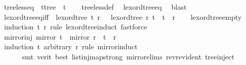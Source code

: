 \begin{isabellebody}
\ tree{\isacharunderscore}{\kern0pt}less{\isacharunderscore}{\kern0pt}eq{\isacharcolon}{\kern0pt}\ {\isachardoublequoteopen}{\isasymnot}\ {\isacharparenleft}{\kern0pt}t{\isacharcolon}{\kern0pt}{\isacharcolon}{\kern0pt}tree{\isacharparenright}{\kern0pt}\ {\isacharless}{\kern0pt}\ t{\isachardoublequoteclose}\isanewline
%
\isadelimproof
\ \ %
\endisadelimproof
%
\isatagproof
{}\isamarkupfalse%
\ tree{\isacharunderscore}{\kern0pt}less{\isacharunderscore}{\kern0pt}def\ \isamarkupfalse%
\ lexord{\isacharunderscore}{\kern0pt}tree{\isacharunderscore}{\kern0pt}eq\ \isamarkupfalse%
\ blast%
\endisatagproof
{\isafoldproof}%
%
\isadelimproof
\isanewline
%
\endisadelimproof
\isanewline
{}\isamarkupfalse%
\ lexord{\isacharunderscore}{\kern0pt}tree{\isacharunderscore}{\kern0pt}eq{\isacharunderscore}{\kern0pt}iff{\isacharcolon}{\kern0pt}\ {\isachardoublequoteopen}{\isasymnot}\ lexord{\isacharunderscore}{\kern0pt}tree\ t\ r\ {\isasymand}\ {\isasymnot}\ lexord{\isacharunderscore}{\kern0pt}tree\ r\ t\ {\isasymlongleftrightarrow}\ t\ {\isacharequal}{\kern0pt}\ r{\isachardoublequoteclose}\isanewline
%
\isadelimproof
\ \ %
\endisadelimproof
%
\isatagproof
{}\isamarkupfalse%
\ lexord{\isacharunderscore}{\kern0pt}tree{\isacharunderscore}{\kern0pt}empty{}\ \isamarkupfalse%
\ {\isacharparenleft}{\kern0pt}induction\ t\ r\ rule{\isacharcolon}{\kern0pt}\ lexord{\isacharunderscore}{\kern0pt}tree{\isachardot}{\kern0pt}induct{\isacharcomma}{\kern0pt}\ fastforce{\isacharplus}{\kern0pt}{\isacharparenright}{\kern0pt}%
\endisatagproof
{\isafoldproof}%
%
\isadelimproof
\isanewline
%
\endisadelimproof
\isanewline
{}\isamarkupfalse%
\ mirror{\isacharunderscore}{\kern0pt}inj{\isacharcolon}{\kern0pt}\ {\isachardoublequoteopen}mirror\ t\ {\isacharequal}{\kern0pt}\ mirror\ r\ {\isasymLongrightarrow}\ t\ {\isacharequal}{\kern0pt}\ r{\isachardoublequoteclose}\isanewline
%
\isadelimproof
\ \ %
\endisadelimproof
%
\isatagproof
{}\isamarkupfalse%
\ {\isacharparenleft}{\kern0pt}induction\ t\ arbitrary{\isacharcolon}{\kern0pt}\ r\ rule{\isacharcolon}{\kern0pt}\ mirror{\isachardot}{\kern0pt}induct{\isacharcomma}{\kern0pt}\isanewline
\ \ \ \ \ \ smt\ {\isacharparenleft}{\kern0pt}verit{\isacharcomma}{\kern0pt}\ best{\isacharparenright}{\kern0pt}\ list{\isachardot}{\kern0pt}inj{\isacharunderscore}{\kern0pt}map{\isacharunderscore}{\kern0pt}strong\ mirror{\isachardot}{\kern0pt}elims\ rev{\isacharunderscore}{\kern0pt}rev{\isacharunderscore}{\kern0pt}ident\ tree{\isachardot}{\kern0pt}inject{\isacharparenright}{\kern0pt}%

\end{isabellebody}
